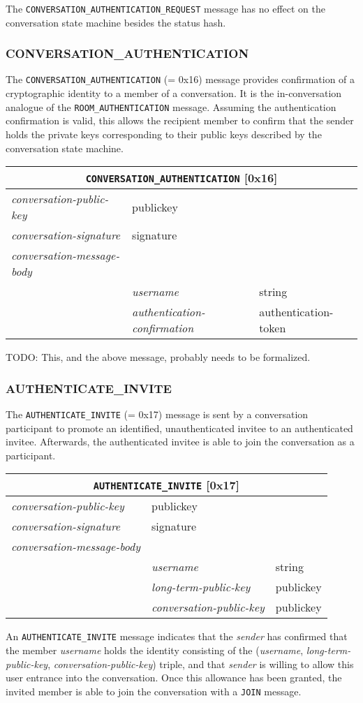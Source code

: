 \documentclass{article}
\def\message#1{\texttt{#1}}
\def\field#1{\textit{#1}}
\def\smfield#1{\textsf{#1}}
\newenvironment{conversationmessage}[2]{
\newcommand{\messagefield}[2]{
& \field{##1} & \textsf{##2} \\
\hline
}
\begin{tabular}{|l|l|l|}
\hline
\multicolumn{3}{|c|}{\message{#1} [#2]} \\
\hline
\hline
\field{conversation-public-key} & \multicolumn{2}{l|}{\textsf{publickey}} \\
\hline
\field{conversation-signature} & \multicolumn{2}{l|}{\textsf{signature}} \\
\hline
\field{conversation-message-body} & \multicolumn{2}{l|}{} \\
\hline
}{
\end{tabular}
}
\begin{document}
The \message{CONVERSATION\_AUTHENTICATION\_REQUEST} message has no effect on the conversation state machine besides the \smfield{status hash}.

\subsubsection{CONVERSATION\_AUTHENTICATION}

The \message{CONVERSATION\_AUTHENTICATION} (= 0x16) message provides confirmation of a cryptographic identity to a member of a conversation.
It is the in-conversation analogue of the \message{ROOM\_AUTHENTICATION} message.
Assuming the authentication confirmation is valid, this allows the recipient member to confirm that the sender holds the private keys corresponding to their public keys described by the conversation state machine.

\begin{conversationmessage}{CONVERSATION\_AUTHENTICATION}{0x16}
\messagefield{username}{string}
\messagefield{authentication-confirmation}{authentication-token}
\end{conversationmessage}

TODO: This, and the above message, probably needs to be formalized.






\subsubsection{AUTHENTICATE\_INVITE}

The \message{AUTHENTICATE\_INVITE} (= 0x17) message is sent by a conversation participant to promote an identified, unauthenticated invitee to an authenticated invitee.
Afterwards, the authenticated invitee is able to join the conversation as a participant.

\begin{conversationmessage}{AUTHENTICATE\_INVITE}{0x17}
\messagefield{username}{string}
\messagefield{long-term-public-key}{publickey}
\messagefield{conversation-public-key}{publickey}
\end{conversationmessage}

An \message{AUTHENTICATE\_INVITE} message indicates that the \field{sender} has confirmed that the member \field{username} holds the identity consisting of the (\field{username}, \field{long-term-public-key}, \field{conversation-public-key}) triple, and that \field{sender} is willing to allow this user entrance into the conversation.
Once this allowance has been granted, the invited member is able to join the conversation with a \message{JOIN} message.
\end{document}
